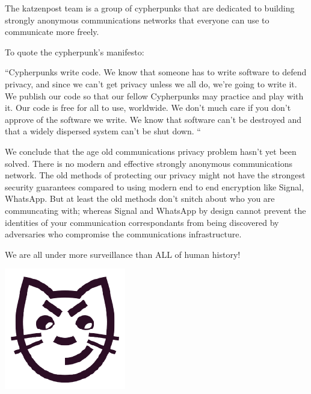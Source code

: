 \documentclass[statementpaper,oneside,article,14pt]{memoir}
\begin{document}
The katzenpost team is a group of cypherpunks that are dedicated to
building strongly anonymous communications networks that everyone can
use to communicate more freely.

To quote the cypherpunk's manifesto:

``Cypherpunks write code. We know that someone has to write software
to defend privacy, and since we can't get privacy unless we all do,
we're going to write it. We publish our code so that our fellow
Cypherpunks may practice and play with it. Our code is free for all to
use, worldwide. We don't much care if you don't approve of the
software we write. We know that software can't be destroyed and that a
widely dispersed system can't be shut down. ``

\newpage

We conclude that the age old communications privacy problem hasn't yet
been solved. There is no modern and effective strongly anonymous
communications network. The old methods of protecting our privacy
might not have the strongest security guarantees compared to using
modern end to end encryption like Signal, WhatsApp. But at least the
old methods don't snitch about who you are communcating with; whereas
Signal and WhatsApp by design cannot prevent the identities of your
communication correspondants from being discovered by adversaries who
compromise the communications infrastructure.



\newpage

\Large We are all under more surveillance than ALL of human history!

\begin{center}
  \includegraphics[scale=.2]{katzenpost_logo} \\
\end{center}
\end{document}
